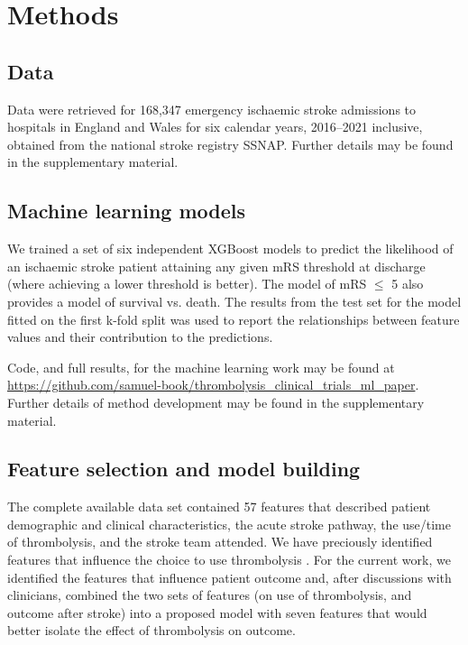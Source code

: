 \section{Methods}

\subsection{Data}

Data were retrieved for 168,347 emergency ischaemic stroke admissions to hospitals in England and Wales for six calendar years, 2016–2021 inclusive, obtained from the national stroke registry SSNAP. Further details may be found in the supplementary material.

\subsection{Machine learning models}

We trained a set of six independent XGBoost models \cite{chen_xgboost_2016} to predict the likelihood of an ischaemic stroke patient attaining any given mRS threshold at discharge (where achieving a lower threshold is better). The model of mRS $\le$ 5 also provides a model of survival vs. death. The results from the test set for the model fitted on the first k-fold split was used to report the relationships between feature values and their contribution to the predictions.

Code, and full results, for the machine learning work may be found at \url{https://github.com/samuel-book/thrombolysis_clinical_trials_ml_paper}. Further details of method development may be found in the supplementary material.

\subsection{Feature selection and model building}

The complete available data set contained 57 features that described patient demographic and clinical characteristics, the acute stroke pathway, the use/time of thrombolysis, and the stroke team attended. We have preciously identified features that influence the choice to use thrombolysis \cite{pearn_are_2024}. For the current work, we identified the features that influence patient outcome and, after discussions with clinicians, combined the two sets of features (on use of thrombolysis, and outcome after stroke) into a proposed model with seven features that would better isolate the effect of thrombolysis on outcome.

